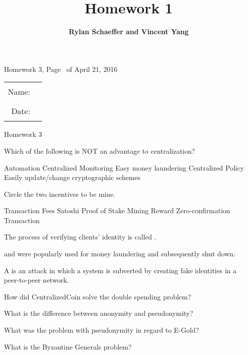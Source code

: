 \documentclass{exam}
\title{\bf Homework 1}
\author{\bf Rylan Schaeffer and Vincent Yang}
\begin{document}
\pagestyle{headandfoot}
\runningheadrule
{}
              {Homework 3, Page \thepage\ of \numpages}
              {April 21, 2016}
\firstpagefooter{}{}{}
\runningfooter{}{}{}
\begin{tabular}{rl}
Name:  & \rule{0.25\linewidth}{\linethickness} \\ 
Date:  & \rule{0.25\linewidth}{\linethickness} \\ 
\end{tabular}
\vspace{5mm}

\begin{center} 
  \Large Homework 3
\end{center} 

\begin{center}
\end{center}

\addpoints
\begin{center}
\gradetable[h][questions]
\end{center}


\begin{questions}

  \question[3]
  Which of the following is NOT an advantage to centralization?
  \begin{choices}
    \choice Automation
    \choice Centralized Monitoring
    \choice Easy money laundering
    \choice Centralized Policy
    \choice Easily update/change cryptographic schemes
  \end{choices}

  \question[3]
  Circle the two incentives to be mine.
  \begin{choices}
    \choice Transaction Fees
    \choice Satoshi
    \choice Proof of Stake
    \choice Mining Reward
    \choice Zero-confirmation Transaction
  \end{choices}

  \question[5] The process of verifying clients' identity is called . 

  \question[5]  and  were popularly used for money laundering and subsequently shut down.

  \question[5] A  is an attack in which a system is subverted by creating fake identities in a peer-to-peer network.

  \question[25] How did CentralizedCoin solve the double spending problem?
  \fillwithlines{.8in}

  \question[10] What is the difference between anonymity and pseudonymity?
  \fillwithlines{.8in}

  \question[20] What was the problem with pseudonymity in regard to E-Gold?
  \fillwithlines{1.2in}

  \question[20] What is the Byzantine Generals problem?
  \fillwithlines{1.2in}
\end{questions}
\end{document}
